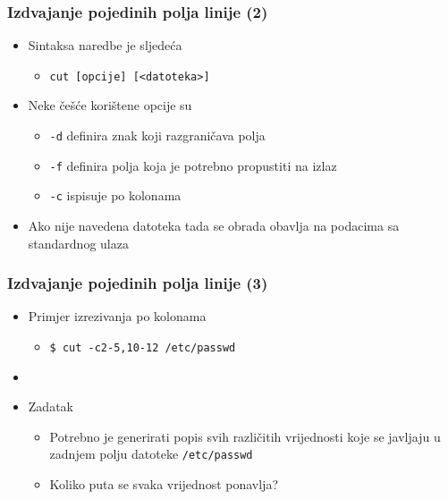 \documentclass{beamer}
\newcommand{\shell}[1]{\texttt{#1}}
\begin{document}
\begin{frame}[t]
\frametitle{Izdvajanje pojedinih polja linije (2)}
\begin{itemize}
  \item Sintaksa naredbe je sljedeća
  \begin{itemize}
    \item[] \shell{cut [opcije] [<datoteka>]}
  \end{itemize}
  \item Neke češće korištene opcije su
  \begin{itemize}
    \item[] \shell{-d} definira znak koji razgraničava polja
    \item[] \shell{-f} definira polja koja je potrebno propustiti na izlaz
    \item[] \shell{-c} ispisuje po kolonama
  \end{itemize}
  \item Ako nije navedena datoteka tada se obrada obavlja na podacima sa
        standardnog ulaza
\end{itemize}
\end{frame}

\begin{frame}[t]
\frametitle{Izdvajanje pojedinih polja linije (3)}
\begin{itemize}
  \item Primjer izrezivanja po kolonama
  \begin{itemize}
    \item[] \shell{\$ cut -c2-5,10-12 /etc/passwd}
  \end{itemize}
  \item[]
  \item Zadatak
  \begin{itemize}
    \item Potrebno je generirati popis svih različitih vrijednosti koje se
          javljaju u zadnjem polju datoteke \shell{/etc/passwd}
    \item Koliko puta se svaka vrijednost ponavlja?
  \end{itemize}
\end{itemize}
\end{frame}
\end{document}
